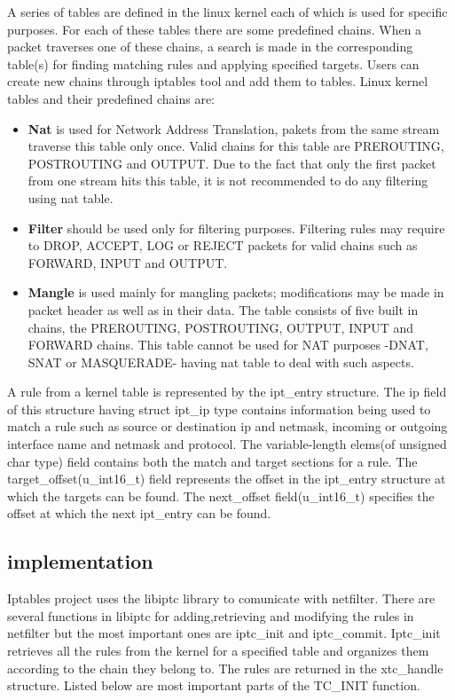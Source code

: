 {{A series of tables are defined in the linux kernel each of which is used for specific purposes. For each of these tables there are some predefined chains. When a packet traverses one of these chains, a search is made in the corresponding table(s) for finding matching rules and applying specified targets. Users can create new chains through iptables tool and add them to tables.
Linux kernel tables and their predefined chains are:       
\begin{itemize}
\item {\bf Nat} is used for Network Address Translation, pakets from the same stream traverse this table only once. Valid chains for this table are PREROUTING, POSTROUTING and OUTPUT. Due to the fact that only the first packet from one stream hits this table, it is not recommended to do any filtering using nat table.
\item {\bf Filter} should be used only for filtering purposes. Filtering rules may require to DROP, ACCEPT, LOG or REJECT packets for valid chains such as FORWARD, INPUT and OUTPUT.
\item {\bf Mangle} is used mainly for mangling packets; modifications may be made in packet header as well as in their data. The table consists of five built in chains, the PREROUTING, POSTROUTING, OUTPUT, INPUT and FORWARD chains. This table cannot be used for NAT purposes -DNAT, SNAT or MASQUERADE- having nat table to deal with such aspects. 
\end{itemize}

A rule from a kernel table is represented by the ipt_entry structure. The ip field of this structure having struct ipt_ip type  contains information being used to match a rule such as source or destination ip and netmask, incoming or outgoing interface name and netmask and protocol. The variable-length elems(of unsigned char type) field contains both the match and target sections for a rule. The target_offset(u_int16_t) field represents the offset in the ipt_entry structure at which the targets can be found. The next_offset field(u_int16_t) specifies the offset at which the next ipt_entry can be found.   

\subsection{\project implementation}
\label{sub-sec:nat-lklnet}
Iptables project uses the libiptc library to comunicate with netfilter. There are several functions in libiptc for adding,retrieving and modifying the rules in netfilter but the most important ones are iptc_init and iptc_commit. 
Iptc_init retrieves all the rules from the kernel for a specified table and organizes them according to the chain they belong to. The rules are returned in the xtc_handle structure. Listed below are most important parts of the TC_INIT function.

}}
